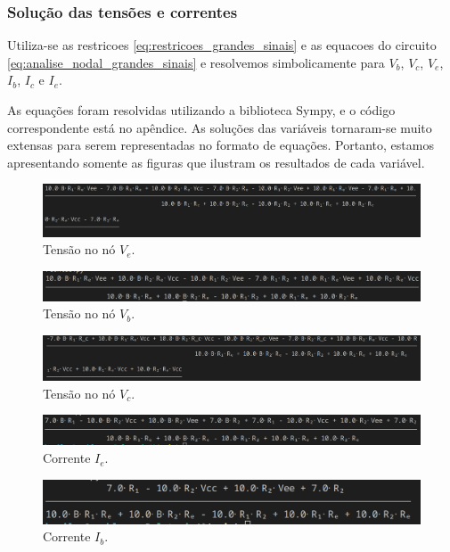 \subsubsection{Solução das tensões e correntes}

Utiliza-se as restricoes \ref*{eq:restricoes_grandes_sinais} e as equacoes do circuito \ref*{eq:analise_nodal_grandes_sinais} e resolvemos simbolicamente para $V_b$, $V_c$, $V_e$, $I_b$, $I_c$ e $I_e$.

As equações foram resolvidas utilizando a biblioteca Sympy, e o código correspondente está no apêndice. As soluções das variáveis tornaram-se muito extensas para serem representadas no formato de equações. Portanto, estamos apresentando somente as figuras que ilustram os resultados de cada variável.

\begin{figure}[H]
    \centering
    \includegraphics[width=0.7\columnwidth]{images/Ve}
    \caption{Tensão no nó $V_e$.}
\end{figure}

\begin{figure}[H]
    \centering
    \includegraphics[width=0.7\columnwidth]{images/Vb}
    \caption{Tensão no nó $V_b$.}
\end{figure}

\begin{figure}[H]
    \centering
    \includegraphics[width=0.7\columnwidth]{images/Vc}
    \caption{Tensão no nó $V_c$.}
\end{figure}

\begin{figure}[H]
    \centering
    \includegraphics[width=0.7\columnwidth]{images/Ie}
    \caption{Corrente $I_e$.}
\end{figure}

\begin{figure}[H]
    \centering
    \includegraphics[width=0.7\columnwidth]{images/Ib}
    \caption{Corrente $I_b$.}
\end{figure}

